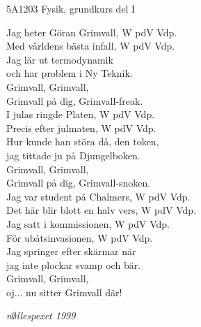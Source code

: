 \documentclass[a6paper,10pt]{article}
\begin{document}
\setlength{\oddsidemargin}{-0.37in}
\noindent
\begin{center}
\footnotesize5A1203 Fysik, grundkurs del I\\
\end{center}
Jag heter Göran Grimvall, W pdV Vdp. \\
Med världens bästa infall, W pdV Vdp. \\
Jag lär ut termodynamik \\
och har problem i Ny Teknik. \\
Grimvall, Grimvall, \\
Grimvall på dig, Grimvall-freak. 
\vspace{5pt} \\
I julas ringde Platen, W pdV Vdp. \\
Precis efter julmaten, W pdV Vdp. \\
Hur kunde han störa då, den token, \\
jag tittade ju på Djungelboken. \\
Grimvall, Grimvall, \\
Grimvall på dig, Grimvall-snoken. 
\vspace{5pt} \\
Jag var student på Chalmers, W pdV Vdp. \\
Det här blir blott en halv vers, W pdV Vdp. 
\vspace{5pt} \\
Jag satt i kommissionen, W pdV Vdp. \\
För ubåtsinvasionen, W pdV Vdp. \\
Jag springer efter skärmar när \\
jag inte plockar svamp och bär. 
\vspace{5pt} \\
Grimvall, Grimvall,\\
 oj... nu sitter Grimvall där! 
\begin{flushright}
\textit{n$\emptyset$llespexet 1999}
\end{flushright}
\end{document}

